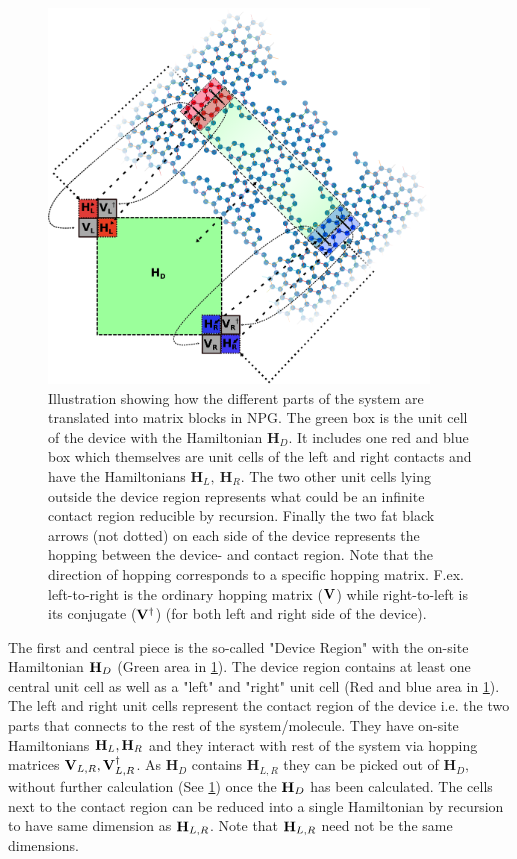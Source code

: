 \begin{figure}
	\centering
	\includegraphics[width=0.9\textwidth]{Figures/illu.eps}
	\caption{Illustration showing how the different parts of the system are translated into matrix blocks in NPG. The green box is the unit cell of the device with the Hamiltonian \(\textbf{H}_D\). It includes one red and blue box which themselves are unit cells of the left and right contacts and have the Hamiltonians \(\textbf{H}_L,\ \textbf{H}_R\). The two other unit cells lying outside the device region represents what could be an infinite contact region reducible by recursion. Finally the two fat black arrows (not dotted) on each side of the device represents the hopping between the device- and contact region. Note that the direction of hopping corresponds to a specific hopping matrix. F.ex. left-to-right is the ordinary hopping matrix (\(\vb{V}\)) while right-to-left is its conjugate (\(\vb{V}^{\dagger}\)) (for both left and right side of the device).}
	\label{systemillu}
\end{figure}
The first and central piece is the so-called "Device Region" with the on-site Hamiltonian \(\vb{H}_D\) (Green area in \cref{systemillu}). The device region contains at least one central unit cell as well as a "left" and "right" unit cell (Red and blue area in \cref{systemillu}). The left and right unit cells represent the contact region of the device i.e. the two parts that connects to the rest of the system/molecule. They have on-site Hamiltonians \(\vb{H}_L,\vb{H}_R\) and they interact with rest of the system via hopping matrices \(\vb{V}_{L,R},\vb{V}^{\dagger}_{L,R}\). As \(\textbf{H}_D\) contains \(\textbf{H}_{L,R}\) they can be picked out of \(\textbf{H}_D,\)  without further calculation (See \cref{systemillu}) once the \(\vb{H}_D\) has been calculated. The cells next to the contact region can be reduced into a single Hamiltonian by recursion to have same dimension as \(\vb{H}_{L,R}\). Note that \(\vb{H}_{L,R}\) need not be the same dimensions.
